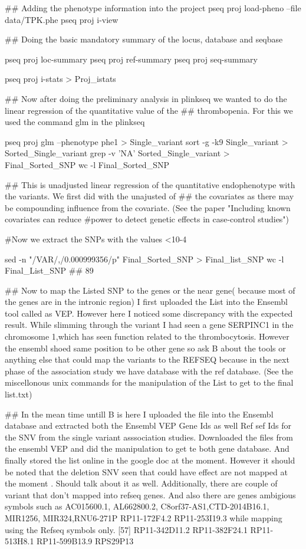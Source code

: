 ## Adding the phenotype information into the project
pseq proj load-pheno --file data/TPK.phe 
pseq proj i-view

## Doing the basic mandatory summary of the locus, database and seqbase

pseq proj loc-summary
pseq proj ref-summary 
pseq proj seq-summary

 pseq proj i-stats > Proj_istats
 
 ## Now after doing the preliminary analysis in plinkseq we wanted to do the linear regression of the quantitative value of the ## thrombopenia. For this we used the command glm in the plinkseq
 
 pseq proj glm --phenotype phe1 > Single_variant
 sort -g -k9 Single_variant > Sorted_Single_variant
 grep -v 'NA' Sorted_Single_variant > Final_Sorted_SNP
 wc -l Final_Sorted_SNP

## This is unadjusted linear regression of the quantitative endophenotype with the variants. We first did with the unajusted of ## the covariates as there may be compounding influence from the covariate. (See the paper "Including known covariates can  reduce #power to detect genetic effects in case-control studies")

#Now we extract the SNPs with the values <10-4

 sed -n "/VAR/,/0.000999356/p" Final_Sorted_SNP > Final_list_SNP
 wc -l Final_List_SNP  ## 89
 
 ## Now to map the Listed SNP to the genes or the near gene( because most of the genes are in the intronic region) I first uploaded the List into the Ensembl tool called as VEP. However here I noticed some discrepancy with the expected result. While slimming through the variant I had seen a gene SERPINC1 in the chromosome 1,which has seen function related to the thrombocytosis. However the ensembl shoed same position to be other gene so ask B about the tools or anything else that could map the variants to the REFSEQ because in the next phase of the association study we have database with the ref database. (See the miscellonous unix commands for the manipulation of the List to get to the final list.txt)

## In the mean time untill B is here I uploaded the file into the Ensembl database and extracted both the Ensembl VEP Gene Ids as well Ref sef Ids for the SNV from the single variant asssociation studies. Downloaded the files from the ensembl VEP and did the manipulation to get te both gene database. And finally stored the list online in the google doc at the moment. However it should be noted that the deletion SNV seen that could have effect are not mapped at the moment . Should talk about it as well. Additionally, there are couple of variant that don't mapped into refseq genes. 
And also there are genes ambigious symbols such as  AC015600.1, AL662800.2, C8orf37-AS1,CTD-2014B16.1, MIR1256, MIR324,RNU6-271P     RP11-172F4.2  RP11-253I19.3 while mapping using the Refseq symbols only. 
[57] RP11-342D11.2 RP11-382F24.1 RP11-513H8.1  RP11-599B13.9 RPS29P13

